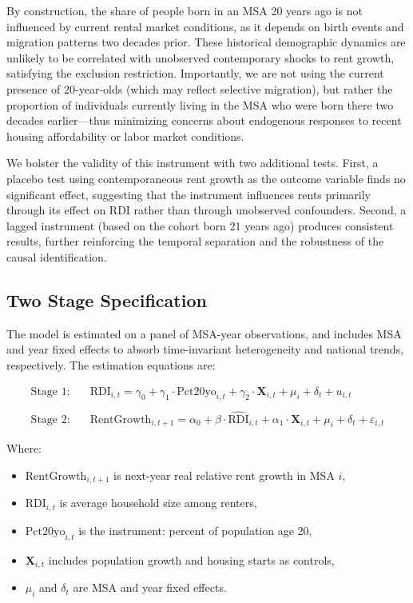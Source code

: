 \documentclass[APA,Times1COL]{WileyNJDv5} %
\begin{document}
By construction, the share of people born in an MSA 20 years ago is not influenced by current rental market conditions, as it depends on birth events and migration patterns two decades prior. These historical demographic dynamics are unlikely to be correlated with unobserved contemporary shocks to rent growth, satisfying the exclusion restriction. Importantly, we are not using the current presence of 20-year-olds (which may reflect selective migration), but rather the proportion of individuals currently living in the MSA who were born there two decades earlier—thus minimizing concerns about endogenous responses to recent housing affordability or labor market conditions.

We bolster the validity of this instrument with two additional tests. First, a placebo test using contemporaneous rent growth as the outcome variable finds no significant effect, suggesting that the instrument influences rents primarily through its effect on RDI rather than through unobserved confounders. Second, a lagged instrument (based on the cohort born 21 years ago) produces consistent results, further reinforcing the temporal separation and the robustness of the causal identification.

\subsection{Two Stage Specification}
The model is estimated on a panel of MSA-year observations, and includes MSA and year fixed effects to absorb time-invariant heterogeneity and national trends, respectively. The estimation equations are:

\begin{align*}
	\text{Stage 1:} \quad & \text{RDI}_{i,t} = \gamma_0 + \gamma_1 \cdot \text{Pct20yo}_{i,t} + \gamma_2 \cdot \mathbf{X}_{i,t} + \mu_i + \delta_t + u_{i,t} \\\\
	\text{Stage 2:} \quad & \text{RentGrowth}_{i,t+1} = \alpha_0 + \beta \cdot \widehat{\text{RDI}}_{i,t} + \alpha_1 \cdot \mathbf{X}_{i,t} + \mu_i + \delta_t + \varepsilon_{i,t}
\end{align*}

Where:
\begin{itemize}
	\item $\text{RentGrowth}_{i,t+1}$ is next-year real relative rent growth in MSA $i$,
	\item $\text{RDI}_{i,t}$ is average household size among renters,
	\item $\text{Pct20yo}_{i,t}$ is the instrument: percent of population age 20,
	\item $\mathbf{X}_{i,t}$ includes population growth and housing starts as controls,
	\item $\mu_i$ and $\delta_t$ are MSA and year fixed effects.
\end{itemize}
\end{document}
